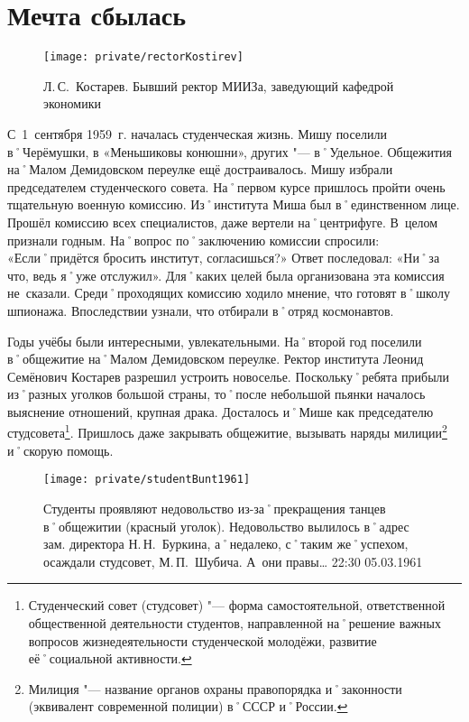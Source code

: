 ﻿\chapter{Мечта сбылась}

\begin{wrapfigure}{O}{.4\textwidth}
\centering
\texttt{[image: private/rectorKostirev]}
\caption[Л.\,С.~Костарев. Бывший ректор МИИЗа, заведующий кафедрой экономики]{Л.\,С.~Костарев. Бывший ректор МИИЗа, заведующий кафедрой экономики\footnotemark}
\label{fig:rectorKostirev}
\end{wrapfigure}

С~1~сентября 1959~г. началась студенческая жизнь. Мишу поселили в˚Черёмушки, в «Меньшиковы конюшни», других "--- в˚Удельное. Общежития на˚Малом Демидовском переулке ещё достраивалось. Мишу избрали председателем студенческого совета. На˚первом курсе пришлось пройти очень тщательную военную комиссию. Из˚института Миша был в˚единственном лице. Прошёл комиссию всех специалистов, даже вертели на˚центрифуге. В~целом признали годным. На˚вопрос по˚заключению комиссии спросили: «Если˚придётся бросить институт, согласишься?» Ответ последовал: «Ни˚за что, ведь я˚уже отслужил». Для˚каких целей была организована эта комиссия не~сказали. Среди˚проходящих комиссию ходило мнение, что готовят в˚школу шпионажа. Впоследствии узнали, что отбирали в˚отряд космонавтов.

Годы учёбы были интересными, увлекательными. На˚второй год поселили в˚общежитие на˚Малом Демидовском переулке. Ректор института Леонид Семёнович Костарев разрешил устроить новоселье. Поскольку˚ребята прибыли из˚разных уголков большой страны, то˚после небольшой пьянки началось выяснение отношений, крупная драка. Досталось и˚Мише как председателю студсовета\footnote{Студенческий совет (студсовет) "--- форма самостоятельной, ответственной общественной деятельности студентов, направленной на˚решение важных вопросов жизнедеятельности студенческой молодёжи, развитие её˚социальной активности.}. Пришлось даже закрывать общежитие, вызывать наряды милиции\footnote{Милиция "--- название органов охраны правопорядка и˚законности (эквивалент современной полиции) в˚СССР и˚России.} и˚скорую помощь.

\begin{figure}[h]
\texttt{[image: private/studentBunt1961]}
\caption[Студенты проявляют недовольство из-за˚прекращения танцев в˚общежитии (красный уголок). Недовольство вылилось в˚адрес зам. директора Н.\,Н.~Буркина, а˚недалеко, с˚таким же˚успехом, осаждали студсовет, М.\,П.~Шубича. А~они правы… 22:30 05.03.1961]{Студенты проявляют недовольство из-за˚прекращения танцев в˚общежитии (красный уголок). Недовольство вылилось в˚адрес зам. директора Н.\,Н.~Буркина, а˚недалеко, с˚таким же˚успехом, осаждали студсовет, М.\,П.~Шубича. А~они правы… 22:30 05.03.1961\footnotemark}
\label{fig:studentBunt1961}
\end{figure}

